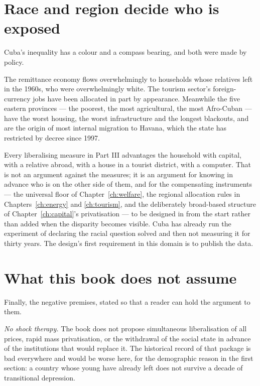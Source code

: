 \section{Race and region decide who is exposed}

Cuba's inequality has a colour and a compass bearing, and both were made by
policy.

The remittance economy flows overwhelmingly to households whose relatives left
in the 1960s, who were overwhelmingly white. The tourism sector's
foreign-currency jobs have been allocated in part by appearance. Meanwhile the
five eastern provinces --- the poorest, the most agricultural, the most
Afro-Cuban --- have the worst housing, the worst infrastructure and the longest
blackouts, and are the origin of most internal migration to Havana, which the
state has restricted by decree since 1997.

Every liberalising measure in Part III advantages the household with capital,
with a relative abroad, with a house in a tourist district, with a computer.
That is not an argument against the measures; it is an argument for knowing in
advance who is on the other side of them, and for the compensating instruments
--- the universal floor of Chapter~\ref{ch:welfare}, the regional allocation
rules in Chapters~\ref{ch:energy} and \ref{ch:tourism}, and the deliberately
broad-based structure of Chapter~\ref{ch:capital}'s privatisation --- to be
designed in from the start rather than added when the disparity becomes
visible. Cuba has already run the experiment of declaring the racial question
solved and then not measuring it for thirty years. The design's first
requirement in this domain is to publish the data.

\section{What this book does not assume}

Finally, the negative premises, stated so that a reader can hold the argument to
them.

\emph{No shock therapy.} The book does not propose simultaneous liberalisation
of all prices, rapid mass privatisation, or the withdrawal of the social state
in advance of the institutions that would replace it. The historical record of
that package is bad everywhere and would be worse here, for the demographic
reason in the first section: a country whose young have already left does not
survive a decade of transitional depression.

